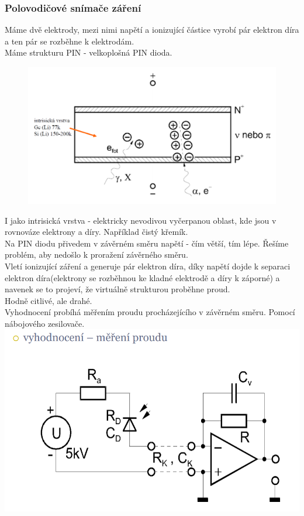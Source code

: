 \subsubsection*{Polovodičové snímače záření}
Máme dvě elektrody, mezi nimi napětí a ionizující částice vyrobí pár elektron díra a ten pár se rozběhne k elektrodám.\\
Máme strukturu PIN - velkoplošná PIN dioda.\\
\begin{figure}[h!]
    \centering
    \includegraphics[scale = 0.1]{img/PolovDet.png}
\end{figure}
I jako intrisická vrstva - elektricky nevodivou vyčerpanou oblast, kde jsou v rovnováze elektrony a díry. Například čistý křemík.\\
Na PIN diodu přivedem v závěrném směru napětí - čím větší, tím lépe. Řešíme problém, aby nedošlo k proražení závěrného směru.\\
Vletí ionizující záření a generuje pár elektron díra, díky napětí dojde k separaci elektron díra(elektrony se rozběhnou ke kladné elektrodě a díry k záporné) a navenek se to projeví, že virtuálně strukturou proběhne proud.\\
Hodně citlivé, ale drahé.\\
Vyhodnocení probíhá měřením proudu procházejícího v závěrném směru. Pomocí nábojového zesilovače.\\
\includegraphics*[scale= 0.5]{img/polovodic-ionizacni.png}
